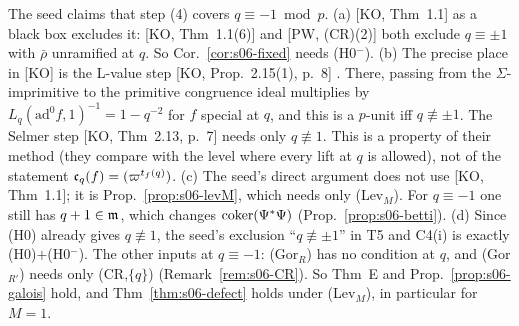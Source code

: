 \begin{remark}\label{rem:s06-minus1}
The seed claims that step (4) covers $q\equiv-1\bmod p$. (a) [KO, Thm~1.1] as a black box excludes it: [KO, Thm~1.1(6)] and
[PW, (CR)(2)] both exclude $q\equiv\pm1$ with $\bar\rho$ unramified at $q$. So Cor.~\ref{cor:s06-fixed} needs (H0$^-$). (b) The
precise place in [KO] is the L-value step [KO, Prop.~2.15(1), p.~8] . There, passing from the $\Sigma$-imprimitive to the primitive congruence ideal multiplies by
$L_q(\mathrm{ad}^0f,1)^{-1}=1-q^{-2}$ for $f$ special at $q$, and this is a $p$-unit iff $q\not\equiv\pm1$. The Selmer step
[KO, Thm~2.13, p.~7] needs only $q\not\equiv1$. This is a property of their method (they compare with the level where every lift at
$q$ is allowed), not of the statement $\mathfrak{c}_q(f)=(\varpi^{t_f(q)})$. (c) The seed's direct argument does not use [KO, Thm~1.1]; it is
Prop.~\ref{prop:s06-levM}, which needs only (Lev$_M$). For $q\equiv-1$ one still has $q+1\in\mathfrak{m}$, which changes $\operatorname{coker}(\Psi^*\Psi)$
(Prop.~\ref{prop:s06-betti}). (d) Since (H0) already gives $q\not\equiv1$, the seed's exclusion ``$q\not\equiv\pm1$'' in T5 and C4(i)
is exactly (H0)$+$(H0$^-$). The other inputs at $q\equiv-1$: (Gor$_R$) has no condition at $q$, and (Gor$_{R'}$) needs only
(CR,$\{q\}$) (Remark~\ref{rem:s06-CR}). So Thm~E and Prop.~\ref{prop:s06-galois} hold, and Thm~\ref{thm:s06-defect} holds under
(Lev$_M$), in particular for $M=1$.
\end{remark}

